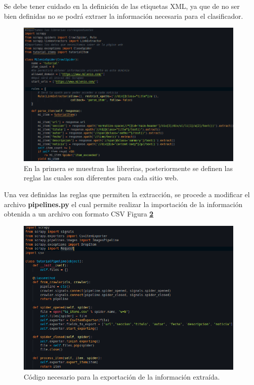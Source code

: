 Se debe tener cuidado en la definición de las etiquetas XML, ya que de no ser bien definidas no se podrá extraer la información necesaria 
para el clasificador.
\\

\begin{figure}[H]
  \centering
  \includegraphics[scale=.45]{imagenes/Capitulo5/6}
  \caption{En la primera se muestran las librerias, posteriormente se definen las reglas las cuales son diferentes para cada sitio web.}
  \label{fig:seis}
\end{figure}

Una vez definidas las reglas que permiten la extracción, se procede a modificar el archivo \textbf{pipelines.py} el cual permite realizar 
la importación de la información obtenida a un archivo con formato CSV Figura \textbf{\ref{fig:siete}}
\\
\begin{figure}[H]
  \centering
  \includegraphics[scale=.45]{imagenes/Capitulo5/7}
  \caption{Código necesario para la exportación de la información extraída.}
  \label{fig:siete}
\end{figure}

